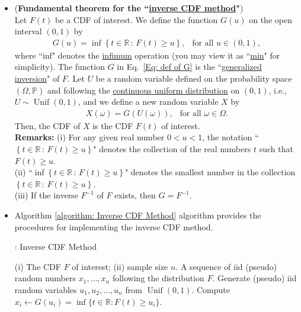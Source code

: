 \documentclass[11pt,letterpaper, leqno]{article}
\begin{document}
\begin{itemize}
\item (\textbf{Fundamental theorem for the ``\href{https://en.wikipedia.org/wiki/Inverse_transform_sampling}{inverse CDF method}"})\\ 
Let $F(t)$ be a CDF of interest. We define the function $G(u)$ on the open interval $(0,1)$ by
\begin{align}\label{Eq: def of G}
    G(u)=\inf\left\{ t\in\mathbb{R} \,:\, F(t)\ge u
    \right\}, \ \ \mbox{ for all }u\in(0,1),
\end{align}
where ``inf" denotes the \href{https://en.wikipedia.org/wiki/Infimum_and_supremum}{infimum} operation (you may view it as ``\href{https://en.wikipedia.org/wiki/Maximum_and_minimum}{min}" for simplicity). The function $G$ in Eq.~\eqref{Eq: def of G} is the ``\href{https://en.wikipedia.org/wiki/Cumulative_distribution_function#Inverse_distribution_function_(quantile_function)}{generalized inversion}" of $F$. Let $U$ be a random variable defined on the probability space $(\Omega,\mathbb{P})$ and following the \href{https://en.wikipedia.org/wiki/Continuous_uniform_distribution}{continuous uniform distribution} on $(0,1)$, i.e., $U\sim\operatorname{Unif}(0,1)$, and we define a new random variable $X$ by 
\begin{align*}
    X(\omega)=G\left(U(\omega)\right),\ \ \mbox{ for all }\omega\in\Omega.
\end{align*}
Then, the CDF of $X$ is the CDF $F(t)$ of interest. \\
\textbf{Remarks:} (i) For any given real number $0<u<1$, the notation ``$\left\{ t\in\mathbb{R} \,:\, F(t)\ge u
    \right\}$" denotes the collection of the real numbers $t$ such that $F(t)\ge u$. \\
    (ii) ``$\inf\left\{ t\in\mathbb{R} \,:\, F(t)\ge u
    \right\}$" denotes the smallest number in the collection $\left\{ t\in\mathbb{R} \,:\, F(t)\ge u
    \right\}$.\\
(iii) If the inverse $F^{-1}$ of $F$ exists, then $G=F^{-1}$.

\item Algorithm \ref{algorithm: Inverse CDF Method} algorithm provides the procedures for implementing the inverse CDF method.
\begin{algorithm}[ht]
	\caption{: Inverse CDF Method}\label{algorithm: Inverse CDF Method}
	\begin{algorithmic}[1]
		\INPUT
        \noindent (i) The CDF $F$ of interest; (ii) sample size $n$.
		\OUTPUT A sequence of iid (pseudo) random numbers $x_1, \ldots, x_n$ following the distribution $F$.
		\STATE Generate (pseudo) iid random variables $u_1, u_2,\ldots, u_n$ from $\operatorname{Unif}(0,1)$.
        \STATE Compute $x_i \leftarrow G(u_i)=\inf\{t\in\mathbb{R}: F(t)\ge u_i\}$.
		\ENDFOR
		\end{algorithmic}
\end{algorithm}

\end{itemize}
\end{document}

